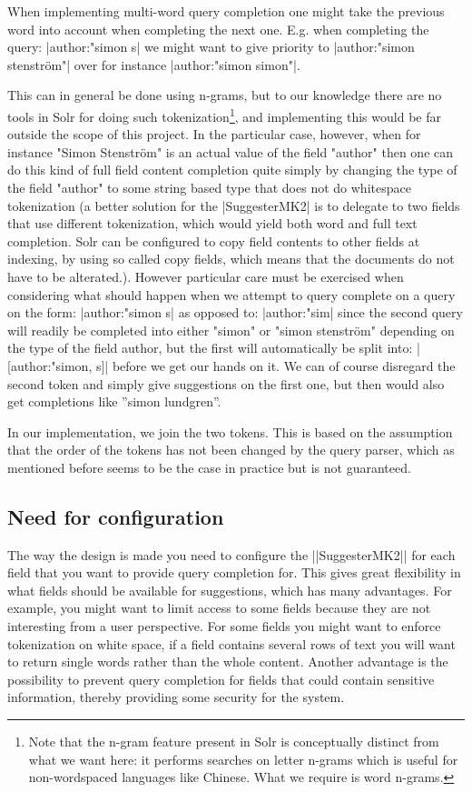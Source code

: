 When implementing multi-word query completion one might take the previous word into account when completing the next one. E.g. when completing the query: |author:"simon s| we might want to give priority to |author:"simon stenström"| over for instance |author:"simon simon"|.

This can in general be done using n-grams, but to our knowledge there are no tools in Solr for doing such tokenization\footnote{Note that the n-gram feature present in Solr is conceptually distinct from what we want here: it performs searches on letter n-grams which is useful for non-wordspaced languages like Chinese. What we require is word n-grams.}, and implementing this would be far outside the scope of this project. In the particular case, however, when for instance "Simon Stenström" is an actual value of the field "author" then one can do this kind of full field content completion quite simply by changing the type of the field "author" to some string based type that does not do whitespace tokenization (a better solution for the |SuggesterMK2| is to delegate to two fields that use different tokenization, which would yield both word and full text completion. Solr can be configured to copy field contents to other fields at indexing, by using so called copy fields, which means that the documents do not have to be alterated.).
However particular care must be exercised when considering what should happen when we attempt to query complete on a query on the form: |author:"simon s| as opposed to: |author:"sim| since the second query will readily be completed into either "simon" or "simon stenström" depending on the type of the field author, but the first will automatically be split into: |[author:"simon, s]| before we get our hands on it. We can of course disregard the second token and simply give suggestions on the first one, but then would also get completions like ''simon lundgren''.

In our implementation, we join the two tokens. This is based on the assumption that the order of the tokens has not been changed by the query parser, which as mentioned before seems to be the case in practice but is not guaranteed. 


\subsection{Need for configuration}

The way the design is made you need to configure the ||SuggesterMK2|| for each field that you want to provide query completion for. This gives great flexibility in what fields should be available for suggestions, which has many advantages. For example, you might want to limit access to some fields because they are not interesting from a user perspective. For some fields you might want to enforce tokenization on white space, if a field contains several rows of text you will want to return single words rather than the whole content.  Another advantage is the possibility to prevent query completion for fields that could contain sensitive information, thereby providing some security for the system.


